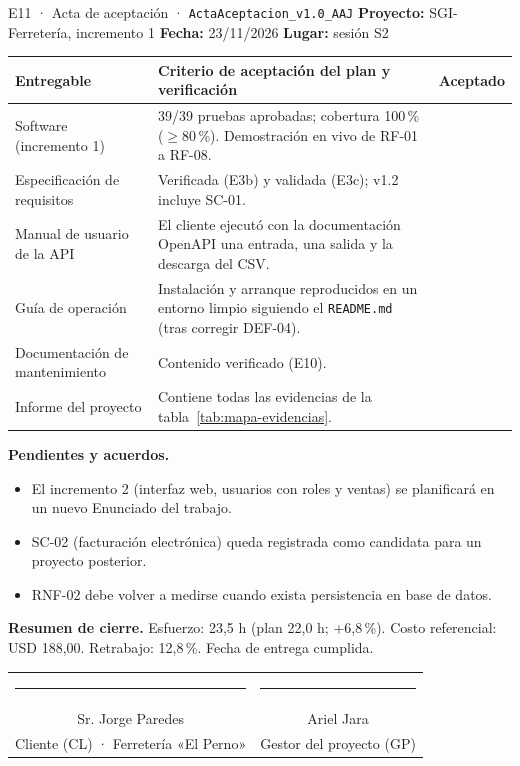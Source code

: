 \documentclass[11pt,a4paper]{article}
\newcommand{\si}{\textcolor{verdeespe}{\ding{51}}}
\newcommand{\cod}[1]{\texttt{\small #1}}
\begin{document}
\newpage
\begin{evidencia}{E11 · Acta de aceptación · \cod{ActaAceptacion\_v1.0\_AAJ}}
\small
\textbf{Proyecto:} SGI-Ferretería, incremento 1 \quad \textbf{Fecha:} 23/11/2026 \quad \textbf{Lugar:} sesión S2

\vspace{0.2cm}
\begin{tabularx}{\linewidth}{@{}P{4.0cm} L c@{}}
\toprule
\textbf{Entregable} & \textbf{Criterio de aceptación del plan y verificación} & \textbf{Aceptado} \\
\midrule
Software (incremento 1) & 39/39 pruebas aprobadas; cobertura 100\,\% ($\geq 80$\,\%). Demostración en vivo de RF-01 a RF-08. & \si \\
Especificación de requisitos & Verificada (E3b) y validada (E3c); v1.2 incluye SC-01. & \si \\
Manual de usuario de la API & El cliente ejecutó con la documentación OpenAPI una entrada, una salida y la descarga del CSV. & \si \\
Guía de operación & Instalación y arranque reproducidos en un entorno limpio siguiendo el \cod{README.md} (tras corregir DEF-04). & \si \\
Documentación de mantenimiento & Contenido verificado (E10). & \si \\
Informe del proyecto & Contiene todas las evidencias de la tabla~\ref{tab:mapa-evidencias}. & \si \\
\bottomrule
\end{tabularx}

\vspace{0.2cm}
\textbf{Pendientes y acuerdos.}
\begin{itemize}
  \item El incremento 2 (interfaz web, usuarios con roles y ventas) se planificará en un nuevo Enunciado del trabajo.
  \item SC-02 (facturación electrónica) queda registrada como candidata para un proyecto posterior.
  \item RNF-02 debe volver a medirse cuando exista persistencia en base de datos.
\end{itemize}

\textbf{Resumen de cierre.} Esfuerzo: 23,5 h (plan 22,0 h; +6,8\,\%). Costo referencial: USD 188,00. Retrabajo: 12,8\,\%. Fecha de entrega cumplida.

\vspace{0.6cm}
\begin{tabular}{@{}c@{\hspace{2.2cm}}c@{}}
\rule{5.2cm}{0.4pt} & \rule{5.2cm}{0.4pt} \\
Sr. Jorge Paredes & Ariel Jara \\
Cliente (CL) · Ferretería «El Perno» & Gestor del proyecto (GP) \\
\end{tabular}
\end{evidencia}
\end{document}
